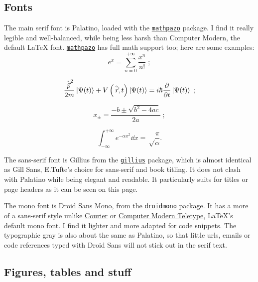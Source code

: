 \documentclass[raggedright, twoside, 11pt]{tufte-style-article}
\begin{document}
\subsection{Fonts}

The main serif font is Palatino, loaded with the \href{www.ctan.org/pkg/mathpazo}{\texttt{mathpazo}} package. I find it really legible and well-balanced, while being less harsh than Computer Modern, the default \LaTeX{} font. \href{www.ctan.org/pkg/mathpazo}{\texttt{mathpazo}} has full math support too; here are some examples:
$$
e^x = \sum_{n=0}^{+\infty} \frac{x^n}{n!} \;; 
$$

$$
\frac{{\hat{\vec p}}^2}{2m}\ket{\Psi(t)} + V\left(\hat{\vec r},t\right)\ket{\Psi(t)} = i\hbar \pdv{}{t}\ket{\Psi(t)} \;;
$$

$$
x_\pm = \frac{-b \pm \sqrt{b^2 - 4ac}}{2a}\;;
$$

$$
\int_{-\infty}^{+\infty} e^{-\alpha x^2} \dd{x} = \sqrt\frac{\pi}{\alpha}.
$$

\begingroup\sffamily
The sans-serif font is Gillius from the \href{www.ctan.org/pkg/gillius}{\texttt{gillius}} package, which is almost identical as Gill Sans, E.Tufte's choice for sans-serif and book titling. It does not clash with Palatino while being elegant and readable. It particularly suits for titles or page headers as it can be seen on this page.
\endgroup

\begingroup\ttfamily
The mono font is Droid Sans Mono, from the \href{www.ctan.org/pkg/droid}{\texttt{droidmono}} package. It has a more of a sans-serif style unlike \href{www.ctan.org/tex-archive/fonts/psfonts/psnfss-source/courier}{Courier} or \href{www.ctan.org/tex-archive/fonts/cm/}{Computer Modern Teletype}, \LaTeX{}'s default mono font. I find it lighter and more adapted for code snippets. The typographic gray is also about the same as Palatino, so that little urls, emails or code references typed with Droid Sans will not stick out in the serif text.
\endgroup

\newpage

\subsection{Figures, tables and stuff}
\end{document}
